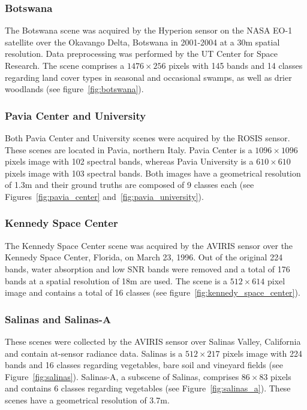 \documentclass[information,article,submit,moreauthors,pdftex]{Definitions/mdpi}
\begin{document}
\begin{paracol}{2}
\linenumbers
\switchcolumn

\subsubsection*{Botswana}

The Botswana scene was acquired by the Hyperion sensor on the NASA EO-1
satellite over the Okavango Delta, Botswana in 2001-2004 at a 30m spatial
resolution. Data preprocessing was performed by the UT Center for Space
Research. The scene comprises a $1476 \times 256$ pixels with 145 bands and 14
classes regarding land cover types in seasonal and occasional swamps, as well
as drier woodlands (see figure~\ref{fig:botswana}).

\subsubsection*{Pavia Center and University}

Both Pavia Center and University scenes were acquired by the ROSIS sensor.
These scenes are located in Pavia, northern Italy. Pavia Center is a $1096
\times 1096$ pixels image with 102 spectral bands, whereas Pavia University is
a $610 \times 610$ pixels image with 103 spectral bands. Both images have a
geometrical resolution of 1.3m and their ground truths are
composed of 9 classes each (see Figures~\ref{fig:pavia_center}
and~\ref{fig:pavia_university}).

\subsubsection*{Kennedy Space Center}

The Kennedy Space Center scene was acquired by the AVIRIS sensor over the
Kennedy Space Center, Florida, on March 23, 1996. Out of the original 224
bands, water absorption and low SNR bands were removed and a total of 176
bands at a spatial resolution of 18m are used. The scene is a $512 \times 614$
pixel image and contains a total of 16 classes (see
figure~\ref{fig:kennedy_space_center}).

\subsubsection*{Salinas and Salinas-A}

These scenes were collected by the AVIRIS sensor over Salinas Valley,
California and contain at-sensor radiance data. Salinas is a $512 \times 217$
pixels image with 224 bands and 16 classes regarding vegetables, bare soil and
vineyard fields (see Figure~\ref{fig:salinas}). Salinas-A, a subscene of
Salinas, comprises $86 \times 83$ pixels and contains 6 classes regarding
vegetables (see Figure~\ref{fig:salinas_a}). These scenes have a geometrical
resolution of 3.7m.


\end{paracol}
\end{document}

